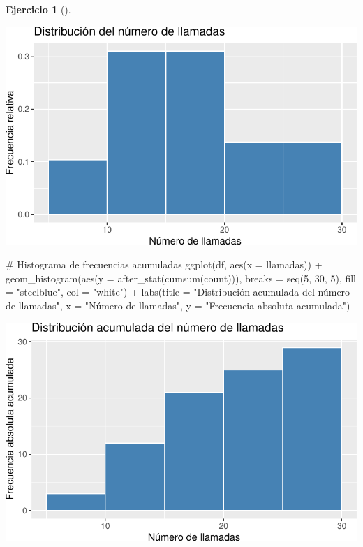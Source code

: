 \documentclass[
  a4paper,
]{scrreport}
\newenvironment{Shaded}{\begin{snugshade}}{\end{snugshade}}
\newcommand{\AttributeTok}[1]{\textcolor[rgb]{0.40,0.45,0.13}{#1}}
\newcommand{\CommentTok}[1]{\textcolor[rgb]{0.37,0.37,0.37}{#1}}
\newcommand{\DecValTok}[1]{\textcolor[rgb]{0.68,0.00,0.00}{#1}}
\newcommand{\FunctionTok}[1]{\textcolor[rgb]{0.28,0.35,0.67}{#1}}
\newcommand{\NormalTok}[1]{\textcolor[rgb]{0.00,0.23,0.31}{#1}}
\newcommand{\SpecialCharTok}[1]{\textcolor[rgb]{0.37,0.37,0.37}{#1}}
\newcommand{\StringTok}[1]{\textcolor[rgb]{0.13,0.47,0.30}{#1}}
\theoremstyle{definition}
\newtheorem{exercise}{Ejercicio}[chapter]
\theoremstyle{remark}
\begin{document}
\begin{exercise}[]
\begin{enumerate}
\begin{tcolorbox}
  \includegraphics{03-frecuencias-graficos_files/figure-pdf/unnamed-chunk-19-2.pdf}

\begin{Shaded}
\begin{Highlighting}[]
\CommentTok{\# Histograma de frecuencias acumuladas}
\FunctionTok{ggplot}\NormalTok{(df, }\FunctionTok{aes}\NormalTok{(}\AttributeTok{x =}\NormalTok{ llamadas)) }\SpecialCharTok{+}
    \FunctionTok{geom\_histogram}\NormalTok{(}\FunctionTok{aes}\NormalTok{(}\AttributeTok{y =} \FunctionTok{after\_stat}\NormalTok{(}\FunctionTok{cumsum}\NormalTok{(count))), }\AttributeTok{breaks =} \FunctionTok{seq}\NormalTok{(}\DecValTok{5}\NormalTok{, }\DecValTok{30}\NormalTok{, }\DecValTok{5}\NormalTok{), }\AttributeTok{fill =} \StringTok{"steelblue"}\NormalTok{, }\AttributeTok{col =} \StringTok{"white"}\NormalTok{) }\SpecialCharTok{+}
    \FunctionTok{labs}\NormalTok{(}\AttributeTok{title =} \StringTok{"Distribución acumulada del número de llamadas"}\NormalTok{, }\AttributeTok{x =} \StringTok{"Número de llamadas"}\NormalTok{, }\AttributeTok{y =} \StringTok{"Frecuencia absoluta acumulada"}\NormalTok{)}
\end{Highlighting}
\end{Shaded}

  \includegraphics{03-frecuencias-graficos_files/figure-pdf/unnamed-chunk-19-3.pdf}


\end{tcolorbox}
\end{enumerate}
\end{exercise}
\end{document}
